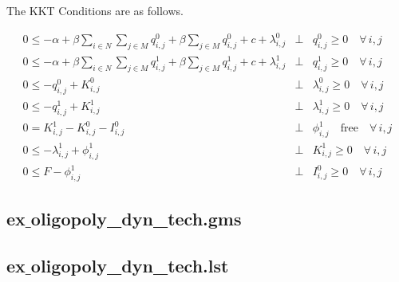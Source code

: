 \documentclass[11pt,a4paper]{article}
\begin{document}
The KKT Conditions are as follows.

\begin{eqnarray*}
	0 \leq -\alpha + \beta \sum_{i\in N}\sum_{j\in M}q_{i,j}^0 + \beta \sum_{j\in M}q_{i,j}^0+ c + \lambda_{i,j}^0 &\bot& q_{i,j}^0 \geq 0\quad\forall\, i,j\\
	0 \leq -\alpha + \beta \sum_{i\in N}\sum_{j\in M}q_{i,j}^1 + \beta\sum_{j\in M} q_{i,j}^1+ c + \lambda_{i,j}^1 &\bot& q_{i,j}^1 \geq 0\quad\forall\, i,j\\
	0 \leq -q_{i,j}^0 + K_{i,j}^0 &\bot& \lambda_{i,j}^0 \geq 0 \quad\forall\, i,j \\
        0 \leq -q_{i,j}^1 + K_{i,j}^1 &\bot& \lambda_{i,j}^1 \geq 0 \quad\forall\, i,j\\
        0 = K_{i,j}^1 - K_{i,j}^0 - I_{i,j}^0 &\bot& \phi_{i,j}^1 \quad \mbox{free} \quad\forall\, i,j \\
        0 \leq -\lambda_{i,j}^1 + \phi_{i,j}^1 &\bot& K_{i,j}^1 \geq 0 \quad\forall\, i,j\\
        0 \leq F - \phi_{i,j}^1 &\bot& I_{i,j}^0 \geq 0 \quad\forall\, i,j
\end{eqnarray*}

\subsection*{ex$\_$oligopoly\_dyn\_tech.gms}


\subsection*{ex$\_$oligopoly\_dyn\_tech.lst}

\end{document}
